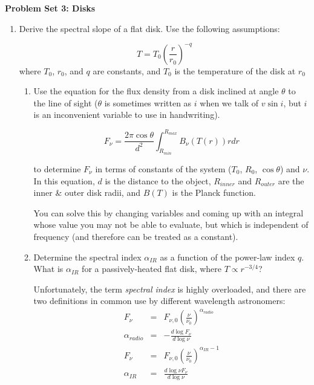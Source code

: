 \documentclass{article}
\begin{document}
\noindent\textbf{Problem Set 3: Disks}








\begin{enumerate}
\item
    Derive the spectral slope of a flat disk.  Use the following assumptions:

    \begin{equation}
        \label{eqn:tpower}
        T = T_0 \left(\frac{r}{r_0}\right)^{-q}
    \end{equation}
    where $T_0$, $r_0$, and $q$ are constants, and $T_0$ is the temperature of the disk at $r_0$

    \begin{enumerate}
        \item Use the equation for the flux density from a disk inclined at
            angle $\theta$ to the line of sight ($\theta$ is sometimes written
            as $i$ when we talk of $v \sin i$, but $i$ is an inconvenient
            variable to use in handwriting).

            \begin{equation}
                F_\nu = \frac{2 \pi \cos\theta}{d^2} \int_{R_{min}}^{R_{max}} B_\nu(T(r)) r dr
            \end{equation}

            to determine $F_\nu$ in terms of constants of the system ($T_0$,
            $R_0$, $\cos \theta$) and $\nu$.  In this equation, $d$ is the
            distance to the object, $R_{inner}$ and $R_{outer}$ are the inner
            \& outer disk radii, and $B(T)$ is the Planck function.  


            You can solve this by changing variables and coming up with an
            integral whose value you may not be able to evaluate, but which is
            independent of frequency (and therefore can be treated as a constant).

        \item Determine the spectral index $\alpha_{IR}$ as a function of the power-law index $q$.
            What is $\alpha_{IR}$ for a passively-heated flat disk, where $T\propto r^{-3/4}$?

            Unfortunately, the term \textit{spectral index} is highly overloaded, and there are two
            definitions in common use by different wavelength astronomers:
            \begin{eqnarray}
                F_\nu  & =&  F_{\nu,0} \left(\frac{\nu}{\nu_0}\right)^{\alpha_{radio}} \\
                \alpha_{radio} & = &  - \frac{d \log {F_\nu}}{d \log \nu}\\
                F_\nu  & =&  F_{\nu,0} \left(\frac{\nu}{\nu_0}\right)^{\alpha_{IR} - 1} \\
                \alpha_{IR} & = & \frac{d \log \nu F_\nu}{d \log \nu}
            \end{eqnarray}


\end{enumerate}
\end{enumerate}
\end{document}
